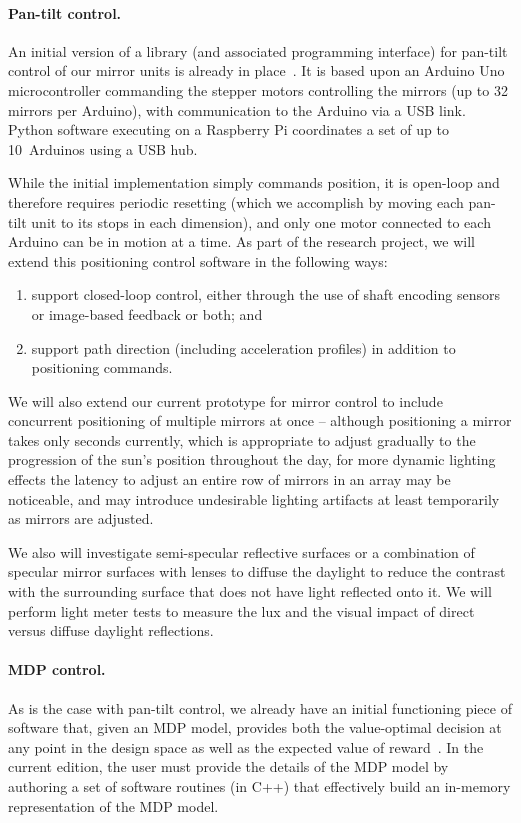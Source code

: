 \paragraph{Pan-tilt control.}
An initial version of a library (and associated programming interface) 
for pan-tilt control of our mirror units is already in place~\cite{Mitchell18}.
It is based upon an Arduino Uno microcontroller commanding the stepper
motors controlling the mirrors (up to 32 mirrors per Arduino),
with communication to the Arduino via a USB link.  Python software 
executing on a Raspberry Pi coordinates a set of up to 10~Arduinos using a USB hub.

While the initial implementation simply commands position, it is open-loop
and therefore requires periodic resetting (which we accomplish by moving each
pan-tilt unit to its stops in each dimension), and only one motor 
connected to each Arduino can be in motion at a time.
As part of the research project, we will extend this positioning control
software in the following ways:
\begin{enumerate}

\item support closed-loop control, either through the use of shaft encoding
sensors or image-based feedback or both; and

\item support path direction (including acceleration profiles) in addition
to positioning commands.

\end{enumerate}

We will also extend our current prototype for mirror control to include concurrent 
positioning of multiple mirrors at once -- although positioning a mirror takes only 
seconds currently, which is appropriate to adjust gradually to the progression of 
the sun's position throughout the day, for more dynamic lighting effects the latency 
to adjust an entire row of mirrors in an array may be noticeable, and may introduce 
undesirable lighting artifacts at least temporarily as mirrors are adjusted.

We also will investigate semi-specular reflective surfaces or a
combination of specular mirror surfaces with lenses to diffuse the
daylight to reduce the contrast with the surrounding surface that does
not have light reflected onto it. We will perform light meter tests to
measure the lux and the visual impact of direct versus diffuse
daylight reflections.

\paragraph{MDP control.}
As is the case with pan-tilt control, we already have an initial functioning
piece of software that, given an MDP model, provides both the
value-optimal decision at any point in the design space as well as
the expected value of reward~\cite{mskgct13,tggs10}.
In the current edition, the user must provide the details of the MDP model
by authoring a set of software routines (in C++) that effectively build
an in-memory representation of the MDP model.

